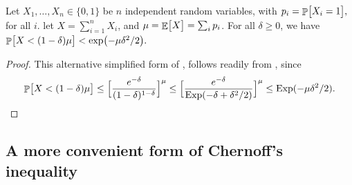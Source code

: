 \begin{fragment}{}
\begin{lemma}
    Let $X_1, \ldots, X_n \in \{0,1\}$ be $n$ independent random
    variables, with
    \begin{math}
        p_i = \Prob{ \bigl. X_i = 1 },
    \end{math}
    for all $i$.  let $X = \sum_{i=1}^{n} X_i$, and
    $\mu = \mathop{\mathbb{E}}\!\left[ {\bigl. X} \right] = \sum_i p_i$. For all $\delta \geq 0$, we
    have
    \begin{math}
        \Prob{\bigl. X < (1-\delta)\mu } < \exp\bigl(-\mu\delta^2/2
        \bigr).
    \end{math}
\end{lemma}
\end{fragment}
\begin{proof}
    This alternative simplified form of , follows
    readily from , since
    \begin{equation*}
        \Prob{ X < (1-\delta)\mu \bigr.} %
        \leq%
        \Bigl[  \frac{e^{-\delta}}{(1-\delta)^{1-\delta}} \Bigr]^\mu%
        \leq
        \Bigl[  \frac{e^{-\delta}}{\Exp\pth{ -\delta + \delta^2/2} }
        \Bigr]^\mu%
        \leq
        \Exp( -\mu\delta^2/2).
    \end{equation*}
\end{proof}



\subsection{A more convenient form of Chernoff's %
   inequality}


